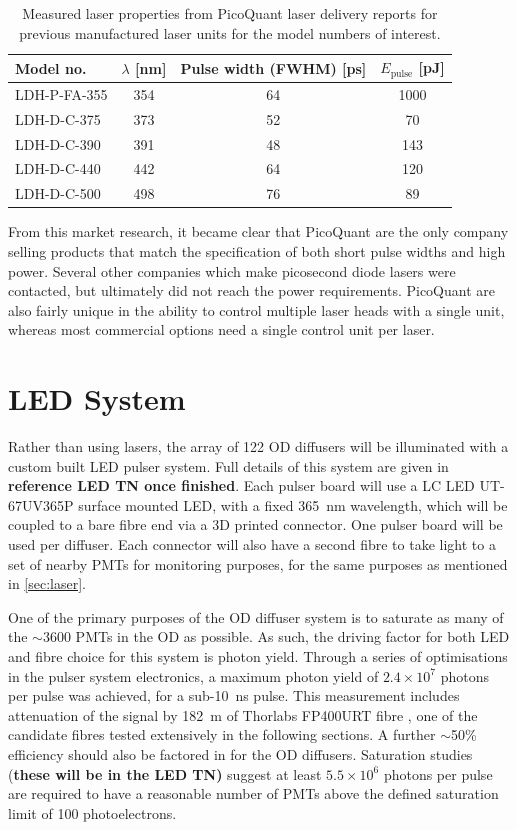 \documentclass[a4paper,11pt]{article}
\let\oldsim\sim
\renewcommand{\sim}{{\oldsim}}
\begin{document}
\begin{table}
\centering
\begin{tabular}{lccc}
\toprule
Model no.	   & $\lambda$ [nm]  & Pulse width (FWHM) [ps] &  $E_\text{pulse}$ [pJ]	\\ \midrule
LDH-P-FA-355	&	354			&   64						&	1000			\\
LDH-D-C-375		&	373			&	52						&	\phantom{00}70	\\
LDH-D-C-390		&	391			&	48						&	\phantom{0}143	\\
LDH-D-C-440		&	442			&	64						&	\phantom{0}120	\\
LDH-D-C-500		&	498			&	76						&	\phantom{00}89	\\
 \bottomrule
\end{tabular}
\caption{Measured laser properties from PicoQuant laser delivery reports for previous manufactured laser units  for the model numbers of interest.}\label{tab:laserPower}
\end{table}

From this market research, it became clear that PicoQuant are the only company selling products that match the specification of both short pulse widths and high power. Several other companies which make picosecond diode lasers were contacted, but ultimately did not reach the power requirements. PicoQuant are also fairly unique in the ability to control multiple laser heads with a single unit, whereas most commercial options need a single control unit per laser.

\section{LED System}\label{sec:LED}
Rather than using lasers, the array of 122 OD diffusers will be illuminated with a custom built LED pulser system. Full details of this system are given in {\bf reference LED TN once finished}. Each pulser board will use a LC LED UT-67UV365P \cite{bib:LCLED} surface mounted LED, with a fixed 365~nm wavelength, which will be coupled to a bare fibre end via a 3D printed connector. One pulser board will be used per diffuser. Each connector will also have a second fibre to take light to a set of nearby PMTs for monitoring purposes, for the same purposes as mentioned in \cref{sec:laser}.

One of the primary purposes of the OD diffuser system is to saturate as many of the $\sim3600$ PMTs in the OD as possible. As such, the driving factor for both LED and fibre choice for this system is photon yield. Through a series of optimisations in the pulser system electronics, a maximum photon yield of $2.4\times10^{7}$ photons per pulse was achieved, for a sub-10~ns pulse. This measurement includes attenuation of the signal by 182~m of Thorlabs FP400URT fibre \cite{bib:fp400urt}, one of the candidate fibres tested extensively in the following sections. A further $\sim$50\% efficiency should also be factored in for the OD diffusers. Saturation studies ({\bf these will be in the LED TN)} suggest at least $5.5\times10^6$ photons per pulse are required to have a reasonable number of PMTs above the defined saturation limit of 100 photoelectrons.
\end{document}
